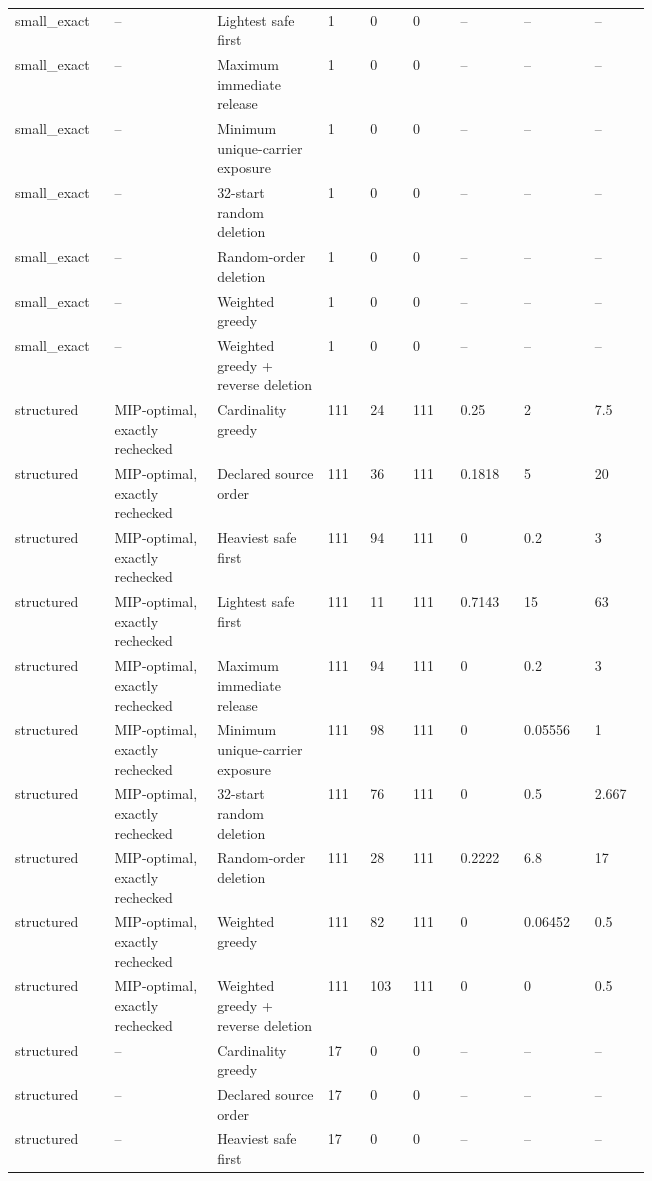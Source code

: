 {\begin{longtable}{p{0.075\linewidth}p{0.13\linewidth}p{0.14\linewidth}p{0.055\linewidth}p{0.055\linewidth}p{0.065\linewidth}p{0.075\linewidth}p{0.075\linewidth}p{0.075\linewidth}}
small\_exact & -- & Lightest safe first & 1 & 0 & 0 & -- & -- & -- \\
small\_exact & -- & Maximum immediate release & 1 & 0 & 0 & -- & -- & -- \\
small\_exact & -- & Minimum unique-carrier exposure & 1 & 0 & 0 & -- & -- & -- \\
small\_exact & -- & 32-start random deletion & 1 & 0 & 0 & -- & -- & -- \\
small\_exact & -- & Random-order deletion & 1 & 0 & 0 & -- & -- & -- \\
small\_exact & -- & Weighted greedy & 1 & 0 & 0 & -- & -- & -- \\
small\_exact & -- & Weighted greedy + reverse deletion & 1 & 0 & 0 & -- & -- & -- \\
structured & MIP-optimal, exactly rechecked & Cardinality greedy & 111 & 24 & 111 & 0.25 & 2 & 7.5 \\
structured & MIP-optimal, exactly rechecked & Declared source order & 111 & 36 & 111 & 0.1818 & 5 & 20 \\
structured & MIP-optimal, exactly rechecked & Heaviest safe first & 111 & 94 & 111 & 0 & 0.2 & 3 \\
structured & MIP-optimal, exactly rechecked & Lightest safe first & 111 & 11 & 111 & 0.7143 & 15 & 63 \\
structured & MIP-optimal, exactly rechecked & Maximum immediate release & 111 & 94 & 111 & 0 & 0.2 & 3 \\
structured & MIP-optimal, exactly rechecked & Minimum unique-carrier exposure & 111 & 98 & 111 & 0 & 0.05556 & 1 \\
structured & MIP-optimal, exactly rechecked & 32-start random deletion & 111 & 76 & 111 & 0 & 0.5 & 2.667 \\
structured & MIP-optimal, exactly rechecked & Random-order deletion & 111 & 28 & 111 & 0.2222 & 6.8 & 17 \\
structured & MIP-optimal, exactly rechecked & Weighted greedy & 111 & 82 & 111 & 0 & 0.06452 & 0.5 \\
structured & MIP-optimal, exactly rechecked & Weighted greedy + reverse deletion & 111 & 103 & 111 & 0 & 0 & 0.5 \\
structured & -- & Cardinality greedy & 17 & 0 & 0 & -- & -- & -- \\
structured & -- & Declared source order & 17 & 0 & 0 & -- & -- & -- \\
structured & -- & Heaviest safe first & 17 & 0 & 0 & -- & -- & -- \\

\end{longtable}}
